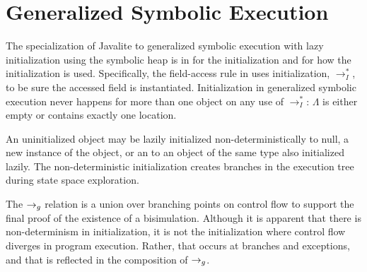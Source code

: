 \section{Generalized Symbolic Execution}
\label{app:gse}
The specialization of Javalite to generalized symbolic execution with
lazy initialization using the symbolic heap is in
 for the initialization and  for
how the initialization is used. Specifically, the field-access rule in
 uses initialization, $\rightarrow_I^*$, to be sure
the accessed field is instantiated. Initialization in generalized
symbolic execution never happens for more than one object on any use
of $\rightarrow_I^*$: $\Lambda$ is either empty or contains exactly
one location.

An uninitialized object may be lazily initialized
non-deterministically to null, a new instance of the object, or an to
an object of the same type also initialized lazily. The
non-deterministic initialization creates branches in the execution
tree during state space exploration. 

The $\rightarrow_{g}$ relation is a union over branching points on control flow
to support the final proof of the existence of a
bisimulation. Although it is apparent that there is non-determinism in
initialization, it is not the initialization where control flow
diverges in program execution. Rather, that occurs at branches and
exceptions, and that is reflected in the composition of $\rightarrow_{g}$.




